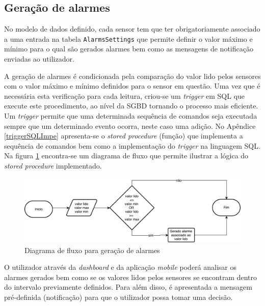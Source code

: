 \subsection{Geração de alarmes}

No modelo de dados definido, cada sensor tem que ter obrigatoriamente associado a uma entrada na tabela \texttt{AlarmsSettings} que permite definir o valor máximo e mínimo para o qual são gerados alarmes bem como as mensagens de notificação enviadas ao utilizador. 

A geração de alarmes é condicionada pela comparação do valor lido pelos sensores com o valor máximo e mínimo definidos para o sensor em questão. Uma vez que é necessária esta verificação para cada leitura, criou-se um \textit{trigger} em \ac{SQL} que execute este procedimento, ao nível da \ac{SGBD} tornando o processo mais eficiente. Um \textit{trigger} permite que uma determinada sequência de comandos seja executada sempre que um determinado evento ocorra, neste caso uma adição. No Apêndice \ref{triggerSQLImpe} apresenta-se o \textit{stored procedure} (função) que implementa a sequência de comandos bem como a implementação do \textit{trigger} na linguagem \ac{SQL}. Na figura \ref{fluxoSP} encontra-se um diagrama de fluxo que permite ilustrar a lógica do \textit{stored procedure} implementado. 

\begin{figure}[!htb]
	\centering
	\includegraphics[scale=0.5]{esquemas/diagramafluxoalarms.pdf}
	\caption{Diagrama de fluxo para geração de alarmes}
	\label{fluxoSP}
\end{figure}



O utilizador através da \textit{dashboard} e da aplicação \textit{mobile} poderá analisar os alarmes gerados bem como se os valores lidos pelos sensores se encontram dentro do intervalo previamente definidos. Para além disso, é apresentada a mensagem pré-definida (notificação) para que o utilizador possa tomar uma decisão.   

